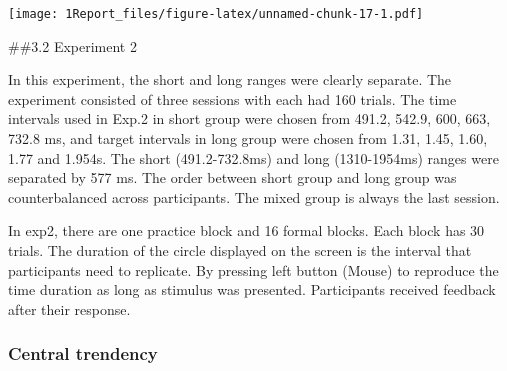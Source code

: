 \documentclass[
]{article}
\begin{document}
\texttt{[image: 1Report\_files/figure-latex/unnamed-chunk-17-1.pdf]}

\#\#3.2 Experiment 2

In this experiment, the short and long ranges were clearly separate. The
experiment consisted of three sessions with each had 160 trials. The
time intervals used in Exp.2 in short group were chosen from 491.2,
542.9, 600, 663, 732.8 ms, and target intervals in long group were
chosen from 1.31, 1.45, 1.60, 1.77 and 1.954s. The short (491.2-732.8ms)
and long (1310-1954ms) ranges were separated by 577 ms. The order
between short group and long group was counterbalanced across
participants. The mixed group is always the last session.

In exp2, there are one practice block and 16 formal blocks. Each block
has 30 trials. The duration of the circle displayed on the screen is the
interval that participants need to replicate. By pressing left button
(Mouse) to reproduce the time duration as long as stimulus was
presented. Participants received feedback after their response.

\hypertarget{central-trendency}{%
\subsubsection{Central trendency}\label{central-trendency}}
\end{document}
